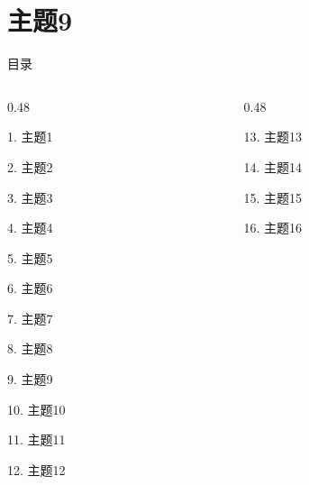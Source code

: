\documentclass[aspectratio=169,10pt,fontset=fandol]{ctexbeamer}
\begin{document}
\section{主题9}
\begin{frame}[t,fragile]{目录}
\small
\begin{columns}[T,onlytextwidth]
\begin{column}{0.48\textwidth}
{\color{black}\small 1. 主题1\par}\vspace{0.22em}
{\color{black}\small 2. 主题2\par}\vspace{0.22em}
{\color{black}\small 3. 主题3\par}\vspace{0.22em}
{\color{black}\small 4. 主题4\par}\vspace{0.22em}
{\color{black}\small 5. 主题5\par}\vspace{0.22em}
{\color{black}\small 6. 主题6\par}\vspace{0.22em}
{\color{black}\small 7. 主题7\par}\vspace{0.22em}
{\color{black}\small 8. 主题8\par}\vspace{0.22em}
{\color{blue}\small 9. 主题9\par}\vspace{0.22em}
{\color{gray!40}\small 10. 主题10\par}\vspace{0.22em}
{\color{gray!40}\small 11. 主题11\par}\vspace{0.22em}
{\color{gray!40}\small 12. 主题12\par}\vspace{0.22em}
\end{column}
\begin{column}{0.48\textwidth}
{\color{gray!40}\small 13. 主题13\par}\vspace{0.22em}
{\color{gray!40}\small 14. 主题14\par}\vspace{0.22em}
{\color{gray!40}\small 15. 主题15\par}\vspace{0.22em}
{\color{gray!40}\small 16. 主题16\par}\vspace{0.22em}

\end{column}
\end{columns}
\end{frame}
\end{document}
